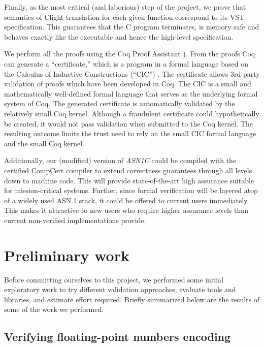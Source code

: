 \documentclass[10p,conference]{IEEEtran}
\begin{document}
Finally, as the most critical (and laborious) step of the project, we
prove that semantics of Clight
translation for each given function correspond to its VST specification. This guarantees that the C program terminates, is memory safe and behaves exactly like the executable and hence the high-level specification.



We perform all the proofs using the Coq Proof Assistant \cite{Coq}). From the
  proofs Coq can generate a ``certificate,'' which is a program in a
  formal language based on the Calculus of Inductive Constructions
  (``CIC'') \cite{CIC}. The certificate allows 3rd party
  validation of proofs which have been developed in Coq. The CIC is a small and mathematically
  well-defined formal language that serves as the underlying formal
  system of Coq. The generated certificate is automatically validated
  by the relatively small Coq kernel. Although a fraudulent
  certificate could hypothetically be created, it would not pass
  validation when submitted to the Coq kernel. The resulting outcome
  limits the trust need to rely on the small CIC formal language and
  the small Coq kernel.

Additionally, our (modified) version of \emph{ASN1C} could be compiled with
the certified CompCert compiler \cite{CompCert} to extend correctness
guarantees through all levels down to machine code. This will provide state-of-the-art high
assurance suitable for mission-critical systems. Further, since formal
verification will be layered atop of a widely used ASN.1 stack, it
could be offered to current users immediately. This makes it attractive to new users who require higher
assurance levels than current non-verified implementations provide.

\section{Preliminary work}

Before committing ourselves to this project, we performed some initial
exploratory work to try different validation approaches, evaluate
tools and libraries, and estimate effort required. Briefly summarized
below are the results of some of the work we performed.

\subsection{Verifying floating-point numbers encoding}
\end{document}
